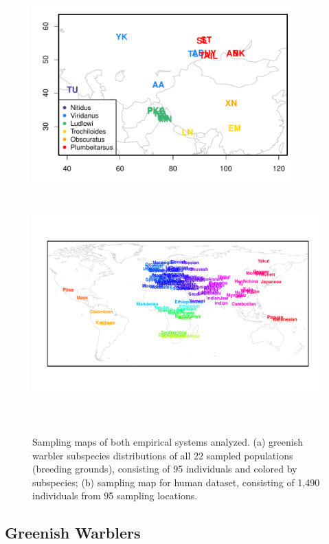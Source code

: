 \documentclass[12pt]{article}
\begin{document}
\begin{figure}
	\centering
			{\includegraphics[width=4in,height=2.67in]{figs/warblers/warbler_sampling_map.pdf}}
			{\includegraphics[width=6in,height=3.6in]{figs/globetrotter/globe_world_map_text.pdf}}
            \caption{Sampling maps of both empirical systems analyzed.  (a) greenish warbler subspecies distributions of all 22 sampled populations (breeding grounds), consisting of 95 individuals and colored by subspecies; (b) sampling map for human dataset, consisting of 1,490 individuals from 95 sampling locations.}
\label{sfig:empirical_maps}
\end{figure}


\subsection*{Greenish Warblers}  
\end{document}

